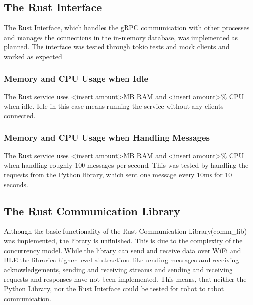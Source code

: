 \subsection{The Rust Interface}
The Rust Interface, which handles the gRPC communication with other processes and manages the connections in the in-memory database, was implemented as planned. The interface was tested through tokio tests and mock clients and worked as expected.

\subsubsection{Memory and CPU Usage when Idle}
The Rust service uses <insert amount>MB RAM and <insert amount>\% CPU when idle. Idle in this case means running the service without any clients connected.

\subsubsection{Memory and CPU Usage when Handling Messages}
The Rust service uses <insert amount>MB RAM and <insert amount>\% CPU when handling roughly 100 messages per second. This was tested by handling the requests from the Python library, which sent one message every 10ms for 10 seconds.

\subsection{The Rust Communication Library}
Although the basic functionality of the Rust Communication Library(comm_lib) was implemented, the library is unfinished. This is due to the complexity of the concurrency model. While the library can send and receive data over WiFi and
BLE the libraries higher level abstractions like sending messages and receiving acknowledgements, sending and receiving streams and sending and receiving requests and responses have not been implemented. This means, that neither the
Python Library, nor the Rust Interface could be tested for robot to robot communication.

